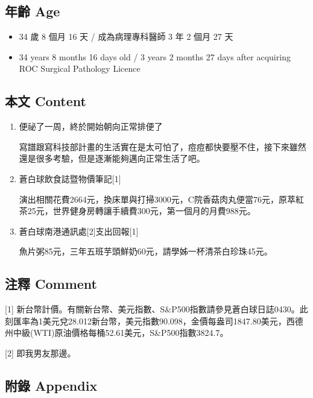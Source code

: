 \documentclass[a5paper, 10pt
]{book}
\providecommand{\tightlist}{%
  \setlength{\itemsep}{0pt}\setlength{\parskip}{0pt}}
\begin{document}
\hypertarget{ux5e74ux9f61-age-38}{%
\subsection{年齡 Age}\label{ux5e74ux9f61-age-38}}

\begin{itemize}
\tightlist
\item
  34 歲 8 個月 16 天 / 成為病理專科醫師 3 年 2 個月 27 天
\item
  34 years 8 months 16 days old / 3 years 2 months 27 days after
  acquiring ROC Surgical Pathology Licence
\end{itemize}

\hypertarget{ux672cux6587-content-38}{%
\subsection{本文 Content}\label{ux672cux6587-content-38}}

\begin{enumerate}
\def\labelenumi{\arabic{enumi}.}
\item
  便祕了一周，終於開始朝向正常排便了

  寫譜跟寫科技部計畫的生活實在是太可怕了，痘痘都快要壓不住，接下來雖然還是很多考驗，但是逐漸能夠邁向正常生活了吧。
\item
  蒼白球飲食誌暨物價筆記{[}1{]}

  演出相關花費2664元，換床單與打掃3000元，C院香菇肉丸便當76元，原萃紅茶25元，世界健身房轉讓手續費300元，第一個月的月費988元。
\item
  蒼白球南港通訊處{[}2{]}支出回報{[}1{]}

  魚片粥85元，三年五班芋頭鮮奶60元，請學姊一杯清茶白珍珠45元。
\end{enumerate}

\hypertarget{ux6ce8ux91cb-comment-38}{%
\subsection{注釋 Comment}\label{ux6ce8ux91cb-comment-38}}

{[}1{]}
新台幣計價。有關新台幣、美元指數、S\&P500指數請參見蒼白球日誌0430。此刻匯率為1美元兌28.012新台幣，美元指數90.098，金價每盎司1847.80美元，西德州中級(WTI)原油價格每桶52.61美元，S\&P500指數3824.7。

{[}2{]} 即我男友那邊。

\hypertarget{ux9644ux9304-appendix-38}{%
\subsection{附錄 Appendix}\label{ux9644ux9304-appendix-38}}
\end{document}
